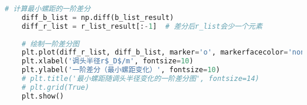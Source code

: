 \documentclass[withoutpreface,bwprint]{cumcmthesis} %
\begin{document}
\begin{lstlisting}[language=Python]
	# 计算最小螺距的一阶差分
	diff_b_list = np.diff(b_list_result)
	diff_r_list = r_list_result[:-1]  # 差分后r_list会少一个元素
	
	# 绘制一阶差分图
	plt.plot(diff_r_list, diff_b_list, marker='o', markerfacecolor='none', color=(0, 146/255, 202/255))
	plt.xlabel('调头半径r$_D$/m', fontsize=10)
	plt.ylabel('一阶差分（最小螺距变化）', fontsize=10)
	# plt.title('最小螺距随调头半径变化的一阶差分图', fontsize=14)
	# plt.grid(True)
	plt.show()
	\end{lstlisting}
\end{document}
